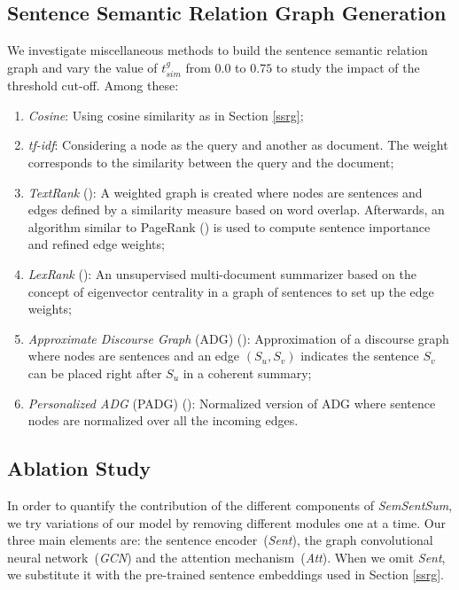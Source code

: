 \documentclass{article}
\begin{document}
\subsection{Sentence Semantic Relation Graph Generation}

We investigate miscellaneous methods to build the sentence semantic relation graph and vary the value of $t_{sim}^g$ from $0.0$ to $0.75$ to study the impact of the threshold cut-off. Among these:
\begin{enumerate}
	\item \textit{Cosine}: Using cosine similarity as in Section \ref{ssrg};
	\item \textit{tf-idf}: Considering a node as the query and another as document. The weight corresponds to the similarity between the query and the document;
	\item \textit{TextRank} (\citet{Mihalcea04TextRank}): A weighted graph is created where nodes are sentences and edges defined by a similarity measure based on word overlap. Afterwards, an algorithm similar to PageRank (\citet{Pageetal98}) is used to compute sentence importance and refined edge weights;
	\item \textit{LexRank} (\citet{Erkan2004}): An unsupervised multi-document summarizer based on the concept of eigenvector centrality in a graph of sentences to set up the edge weights;
	\item \textit{Approximate Discourse Graph} (ADG) (\citet{christensen2013towards}): Approximation of a discourse graph where nodes are sentences and an edge $(S_u,S_v)$ indicates the sentence $S_v$ can be placed right after $S_u$ in a coherent summary;
	\item \textit{Personalized ADG} (PADG) (\citet{Yasunaga17}): Normalized version of ADG where sentence nodes are normalized over all the incoming edges.
\end{enumerate}

\subsection{Ablation Study}

In order to quantify the contribution of the different components of \textit{SemSentSum}, we try variations of our model by removing different modules one at a time. Our three main elements are: the sentence encoder~(\textit{Sent}), the graph convolutional neural network~(\textit{GCN}) and the attention mechanism~(\textit{Att}). When we omit \textit{Sent}, we substitute it with the pre-trained sentence embeddings used in Section \ref{ssrg}.
\end{document}
